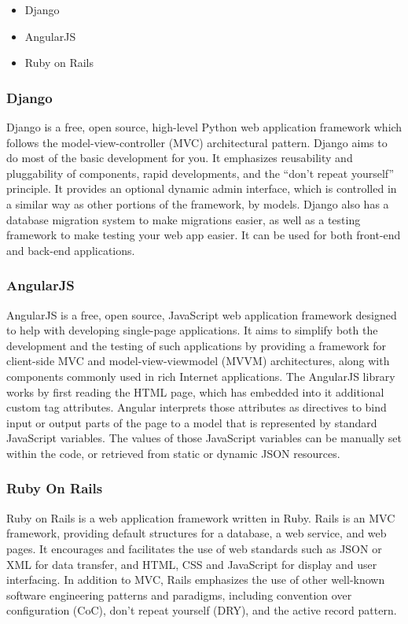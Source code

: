 \documentclass[draftclsnofoot,10pt,onecolumn]{IEEEtran} %
\begin{document}
	\begin{itemize}
		\item Django
		\item AngularJS
		\item Ruby on Rails \\
	\end{itemize}
	
\subsubsection{Django}
Django is a free, open source, high-level Python web application framework which follows the model-view-controller
(MVC) architectural pattern. Django aims to do most of the basic development for you. It emphasizes reusability and
pluggability of components, rapid developments, and the “don’t repeat yourself” principle. It provides an optional dynamic
admin interface, which is controlled in a similar way as other portions of the framework, by models. Django also has a
database migration system to make migrations easier, as well as a testing framework to make testing your web app easier. It
can be used for both front-end and back-end applications.\\

\subsubsection{AngularJS}
AngularJS is a free, open source, JavaScript web application framework designed to help with developing single-page
applications. It aims to simplify both the development and the testing of such applications by providing a framework for
client-side MVC and model-view-viewmodel (MVVM) architectures, along with components commonly used in rich Internet
applications. The AngularJS library works by first reading the HTML page, which has embedded into it additional custom tag
attributes. Angular interprets those attributes as directives to bind input or output parts of the page to a model that is
represented by standard JavaScript variables. The values of those JavaScript variables can be manually set within the code, or
retrieved from static or dynamic JSON resources.\\

\subsubsection{Ruby On Rails}
Ruby on Rails is a web application framework written in Ruby. Rails is an MVC framework, providing default structures for
a database, a web service, and web pages. It encourages and facilitates the use of web standards such as JSON or XML for
data transfer, and HTML, CSS and JavaScript for display and user interfacing. In addition to MVC, Rails emphasizes the use
of other well-known software engineering patterns and paradigms, including convention over configuration (CoC), don't
repeat yourself (DRY), and the active record pattern. \\
\end{document}
